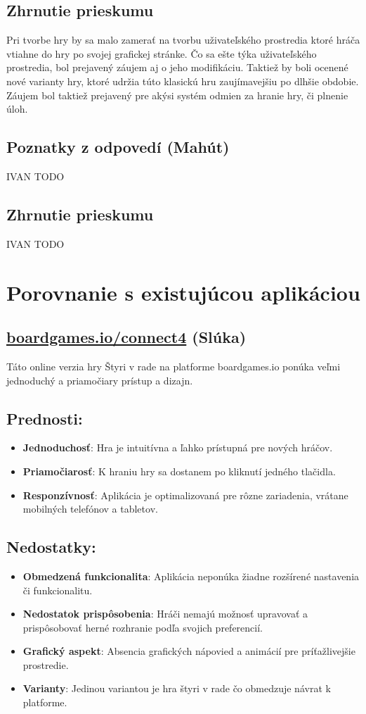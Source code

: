\documentclass[a4paper, 11pt, onecolumn]{article}
\begin{document}
\subsection*{Zhrnutie prieskumu}
Pri tvorbe hry by sa malo zamerať na tvorbu uživateľského prostredia ktoré hráča vtiahne do hry po svojej grafickej stránke.
Čo sa ešte týka uživateľského prostredia, bol prejavený záujem aj o jeho modifikáciu.
Taktiež by boli ocenené nové varianty hry, ktoré udržia túto klasickú hru zaujímavejšiu po dlhšie obdobie. Záujem bol taktiež
prejavený pre akýsi systém odmien za hranie hry, či plnenie úloh.
\subsection{Poznatky z odpovedí (Mahút)}
IVAN TODO
\subsection*{Zhrnutie prieskumu}
IVAN TODO
\section{Porovnanie s existujúcou aplikáciou}
\subsection{\href{https://boardgames.io/en/connect4/gameEnd}{boardgames.io/connect4} (Slúka)}

Táto online verzia hry Štyri v rade na platforme boardgames.io ponúka veľmi jednoduchý a 
priamočiary prístup a dizajn.

\subsection*{Prednosti:}
\begin{itemize}
    \item \textbf{Jednoduchosť}: Hra je intuitívna a ľahko prístupná pre nových hráčov.
    \item \textbf{Priamočiarosť}: K hraniu hry sa dostanem po kliknutí jedného tlačidla. 
    \item \textbf{Responzívnosť}: Aplikácia je optimalizovaná pre rôzne zariadenia, vrátane mobilných telefónov a tabletov.
\end{itemize}

\subsection*{Nedostatky:}
\begin{itemize}
    \item \textbf{Obmedzená funkcionalita}: Aplikácia neponúka žiadne rozšírené nastavenia či funkcionalitu.
    \item \textbf{Nedostatok prispôsobenia}: Hráči nemajú možnosť upravovať a prispôsobovať herné rozhranie podľa svojich preferencií.
    \item \textbf{Grafický aspekt}: Absencia grafických nápovied a animácií pre príťažlivejšie prostredie.
    \item \textbf{Varianty}: Jedinou variantou je hra štyri v rade čo obmedzuje návrat k platforme.
\end{itemize}
\end{document}
